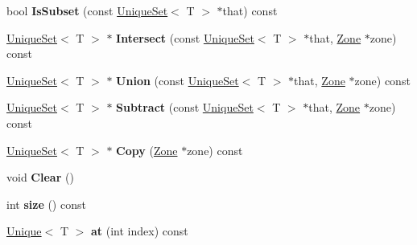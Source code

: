 \begin{DoxyCompactItemize}
\item 
\hypertarget{classv8_1_1internal_1_1_v8___f_i_n_a_l_abe9ccc63c236ba5786ce5a780981cf72}{}bool {\bfseries Is\+Subset} (const \hyperlink{classv8_1_1internal_1_1_unique_set}{Unique\+Set}$<$ T $>$ $\ast$that) const \label{classv8_1_1internal_1_1_v8___f_i_n_a_l_abe9ccc63c236ba5786ce5a780981cf72}

\item 
\hypertarget{classv8_1_1internal_1_1_v8___f_i_n_a_l_a36476120254824053e27785b586f0708}{}\hyperlink{classv8_1_1internal_1_1_unique_set}{Unique\+Set}$<$ T $>$ $\ast$ {\bfseries Intersect} (const \hyperlink{classv8_1_1internal_1_1_unique_set}{Unique\+Set}$<$ T $>$ $\ast$that, \hyperlink{classv8_1_1internal_1_1_zone}{Zone} $\ast$zone) const \label{classv8_1_1internal_1_1_v8___f_i_n_a_l_a36476120254824053e27785b586f0708}

\item 
\hypertarget{classv8_1_1internal_1_1_v8___f_i_n_a_l_ab0010610efb2ac7ecc38a7eb9f42988b}{}\hyperlink{classv8_1_1internal_1_1_unique_set}{Unique\+Set}$<$ T $>$ $\ast$ {\bfseries Union} (const \hyperlink{classv8_1_1internal_1_1_unique_set}{Unique\+Set}$<$ T $>$ $\ast$that, \hyperlink{classv8_1_1internal_1_1_zone}{Zone} $\ast$zone) const \label{classv8_1_1internal_1_1_v8___f_i_n_a_l_ab0010610efb2ac7ecc38a7eb9f42988b}

\item 
\hypertarget{classv8_1_1internal_1_1_v8___f_i_n_a_l_ae654b8aa5141ad4104f328497914fe4e}{}\hyperlink{classv8_1_1internal_1_1_unique_set}{Unique\+Set}$<$ T $>$ $\ast$ {\bfseries Subtract} (const \hyperlink{classv8_1_1internal_1_1_unique_set}{Unique\+Set}$<$ T $>$ $\ast$that, \hyperlink{classv8_1_1internal_1_1_zone}{Zone} $\ast$zone) const \label{classv8_1_1internal_1_1_v8___f_i_n_a_l_ae654b8aa5141ad4104f328497914fe4e}

\item 
\hypertarget{classv8_1_1internal_1_1_v8___f_i_n_a_l_a15caec7f3f11bc2fc5a8b7f058d2726a}{}\hyperlink{classv8_1_1internal_1_1_unique_set}{Unique\+Set}$<$ T $>$ $\ast$ {\bfseries Copy} (\hyperlink{classv8_1_1internal_1_1_zone}{Zone} $\ast$zone) const \label{classv8_1_1internal_1_1_v8___f_i_n_a_l_a15caec7f3f11bc2fc5a8b7f058d2726a}

\item 
\hypertarget{classv8_1_1internal_1_1_v8___f_i_n_a_l_aacdcb71d46d1c976625a16d1254adcfb}{}void {\bfseries Clear} ()\label{classv8_1_1internal_1_1_v8___f_i_n_a_l_aacdcb71d46d1c976625a16d1254adcfb}

\item 
\hypertarget{classv8_1_1internal_1_1_v8___f_i_n_a_l_afb6ba91336226000579e90d8b4c60584}{}int {\bfseries size} () const \label{classv8_1_1internal_1_1_v8___f_i_n_a_l_afb6ba91336226000579e90d8b4c60584}

\item 
\hypertarget{classv8_1_1internal_1_1_v8___f_i_n_a_l_a5426af57b0e60b979196d13de4494ec9}{}\hyperlink{classv8_1_1internal_1_1_unique}{Unique}$<$ T $>$ {\bfseries at} (int index) const \label{classv8_1_1internal_1_1_v8___f_i_n_a_l_a5426af57b0e60b979196d13de4494ec9}

\end{DoxyCompactItemize}

